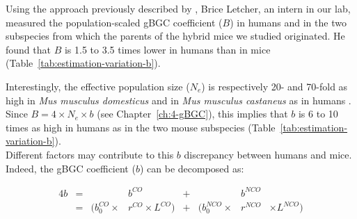 \begin{mccorrection}

Using the approach previously described by \citet{glemin2015quantification}, Brice Letcher, an intern in our lab, measured the population-scaled gBGC coefficient ($B$) in humans and in the two subspecies from which the parents of the hybrid mice we studied originated.
He found that $B$ is 1.5 to 3.5 times lower in humans than in mice (Table~\ref{tab:estimation-variation-b}).


Interestingly, the effective population size ($N_e$) is respectively 20- and 70-fold as high in \textit{Mus musculus domesticus} and in \textit{Mus musculus castaneus} as in humans \citep{charlesworth2009fundamental,phifer-rixey2012adaptive}.
Since $B = 4 \times N_e \times b$ (see Chapter~\ref{ch:4-gBGC}), this implies that $b$ is 6 to 10 times as high in humans as in the two mouse subspecies (Table~\ref{tab:estimation-variation-b}).\\






Different factors may contribute to this $b$ discrepancy between humans and mice.
Indeed, the gBGC coefficient ($b$) can be decomposed as: 


\begin{alignat*}{4}
	    b&={}&                     &b^{CO}                   &{}+{}&                      &b^{NCO}& \\
	     &={}& ( b_{0}^{CO} \times &r^{CO} \times L^{CO}  )  &{}+{}& ( b_{0}^{NCO} \times &r^{NCO}& \times L^{NCO}  )
\end{alignat*}


\end{mccorrection}
